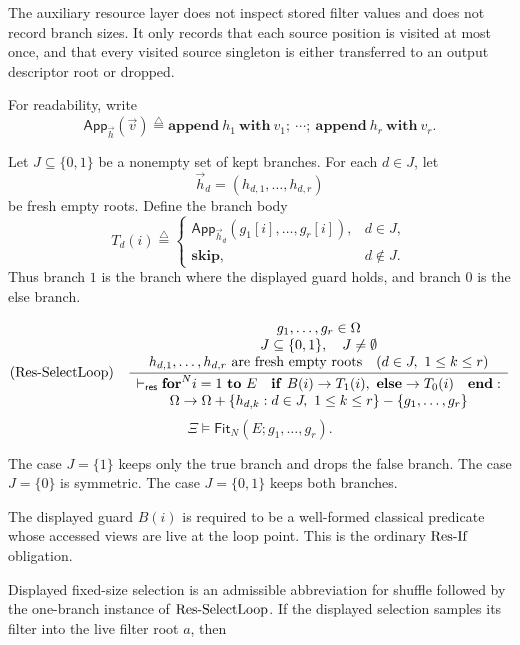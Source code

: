 \documentclass[acmsmall,screen,review,anonymous,nonacm]{acmart}
\theoremstyle{defn_style}
\begin{document}
The auxiliary resource layer does not inspect stored filter values and does not
record branch sizes. It only records that each source position is visited at
most once, and that every visited source singleton is either transferred to an
output descriptor root or dropped.

For readability, write
\[
\mathsf{App}_{\vec h}(\vec v)
\stackrel{\triangle}{=}
\mathbf{append}\ h_1\ \mathbf{with}\ v_1;\
\cdots;\
\mathbf{append}\ h_r\ \mathbf{with}\ v_r .
\]

Let \(J\subseteq\{0,1\}\) be a nonempty set of kept branches. For each
\(d\in J\), let
\[
\vec h_d=(h_{d,1},\ldots,h_{d,r})
\]
be fresh empty roots. Define the branch body
\[
T_d(i)
\stackrel{\triangle}{=}
\begin{cases}
\mathsf{App}_{\vec h_d}(g_1[i],\ldots,g_r[i]),
& d\in J,\\
\mathbf{skip},
& d\notin J.
\end{cases}
\]
Thus branch \(1\) is the branch where the displayed guard holds, and branch
\(0\) is the else branch.

\[
\text{\rm (Res-SelectLoop)}
\quad
\frac{
\begin{array}{c}
g_1,\ldots,g_r\in \Omega\\
J\subseteq\{0,1\},\quad J\ne\emptyset\\
h_{d,1},\ldots,h_{d,r}\text{ are fresh empty roots}
\quad(d\in J,\ 1\le k\le r)
\end{array}
}{
\begin{array}{c}
\vdash_{\mathsf{res}}
\mathbf{for}^{N}i=1\mathbf{~to~}E
\quad
\mathbf{if}\ B(i)\rightarrow T_1(i),
\ \mathbf{else}\rightarrow T_0(i)
\quad
\mathbf{end}
:\\
\Omega\rightarrow\Omega+
\{h_{d,k}:d\in J,\ 1\le k\le r\}
-\{g_1,\ldots,g_r\}
\end{array}
}
\]
\[
\Xi\vDash \mathsf{Fit}_N(E;g_1,\ldots,g_r).
\]

The case \(J=\{1\}\) keeps only the true branch and drops the false branch.
The case \(J=\{0\}\) is symmetric. The case \(J=\{0,1\}\) keeps both branches.

The displayed guard \(B(i)\) is required to be a well-formed
classical predicate whose accessed views are live at the loop point.
This is the ordinary \({\rm Res\mbox{-}If}\) obligation.

Displayed fixed-size selection is an admissible abbreviation for shuffle
followed by the one-branch instance of \({\rm Res\mbox{-}SelectLoop}\). If the
displayed selection samples its filter into the live filter root \(a\), then
\end{document}
